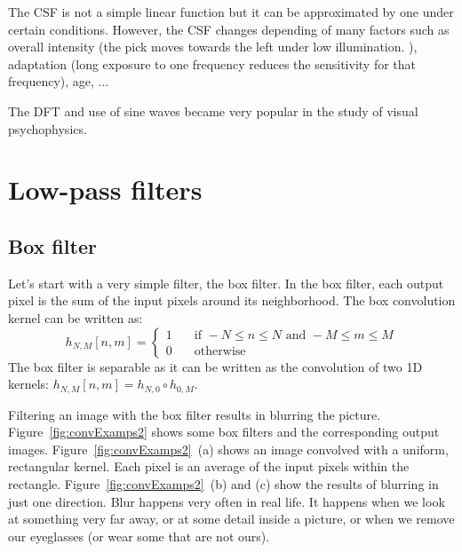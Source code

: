 The CSF is not a simple linear function but it can be approximated by one under certain conditions. However, the CSF changes depending of many factors such as overall intensity (the pick moves towards the left under low illumination. ), adaptation (long exposure to one frequency reduces the sensitivity for that frequency), age, ... 

The DFT and use of sine waves became very popular in the study of visual psychophysics.

%
%
%
%


\section{Low-pass filters}


\subsection{Box filter}

Let's start with a very simple filter, the box filter.  In the box filter, each output pixel is the sum of the input pixels around its neighborhood. The box convolution kernel can be written as:
\begin{equation}
h_{N,M} \left[n,m \right] = 
\begin{cases}
    1       & \quad \text{if } -N \leq n \leq N  \text{~and~}  -M \leq m \leq M\\
    0       & \quad \text{otherwise } 
  \end{cases}
\end{equation}
The box filter is separable as it can be written as the convolution of two 1D kernels: $h_{N,M} \left[n,m \right]  = h_{N,0} \circ h_{0,M}$.

Filtering an image with the box filter results in blurring the picture. Figure~\ref{fig:convExamps2} shows some box filters and the corresponding output images. Figure~\ref{fig:convExamps2}~(a) shows an image convolved with a uniform, rectangular kernel. Each pixel is an average of the input pixels within the rectangle. Figure~\ref{fig:convExamps2}~(b) and (c)  show the results of blurring in just one direction. Blur happens very often in real life. It happens when we look at something very far away, or at some detail inside a picture, or when we remove our eyeglasses (or wear some that are not ours). 


